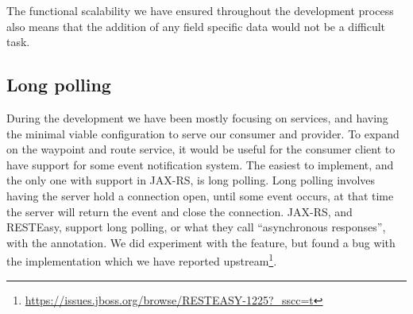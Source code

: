 The functional scalability we have ensured throughout the development process also means that the addition of any field specific data would not be a difficult task.

\subsection{Long polling}
During the development we have been mostly focusing on services, and having the
minimal viable configuration to serve our consumer and provider. To expand on
the waypoint and route service, it would be useful for the consumer client to
have support for some event notification system. The easiest to implement, and
the only one with support in JAX-RS, is long polling. Long polling involves
having the server hold a connection open, until some event occurs, at that time
the server will return the event and close the connection. JAX-RS, and RESTEasy,
support long polling, or what they call ``asynchronous responses'', with the
 annotation. We did experiment with the feature, but found
a bug with the implementation which we have reported
upstream\footnote{\url{https://issues.jboss.org/browse/RESTEASY-1225?_sscc=t}}.


